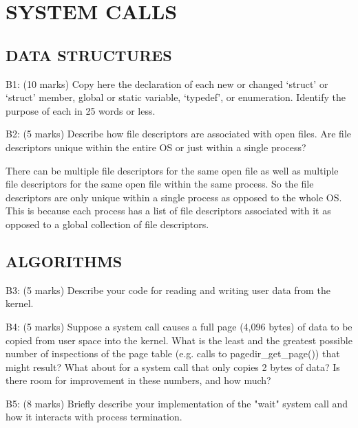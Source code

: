 \section{SYSTEM CALLS}

\subsection*{DATA STRUCTURES}

\noindent B1: (10 marks)
Copy here the declaration of each new or changed `struct' or
`struct' member, global or static variable, `typedef', or
enumeration.  Identify the purpose of each in 25 words or less.

\noindent B2: (5 marks)
Describe how file descriptors are associated with open files.
Are file descriptors unique within the entire OS or just within a
single process?

There can be multiple file descriptors for the same open file as well as multiple file descriptors for the same open file within the same process. So the file descriptors are only unique within a single process as opposed to the whole OS. This is because each process has a list of file descriptors associated with it as opposed to a global collection of file descriptors.

\subsection*{ALGORITHMS}

\noindent B3: (5 marks)
Describe your code for reading and writing user data from the
kernel.

\noindent B4: (5 marks)
Suppose a system call causes a full page (4,096 bytes) of data
to be copied from user space into the kernel.  What is the least and the greatest possible number of inspections of the page table (e.g. calls to pagedir\_get\_page()) that might result?  What about for a system call that only copies 2 bytes of data?  Is there room for improvement in these numbers, and how much?

\noindent B5: (8 marks)
Briefly describe your implementation of the "wait" system call
and how it interacts with process termination.

